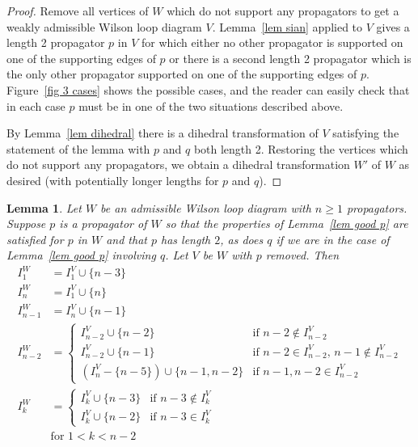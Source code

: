 \documentclass[11pt]{article}
\newtheorem{lem}[thm]{Lemma}
\theoremstyle{remark}
\theoremstyle{definition}
\begin{document}
\begin{proof}
  Remove all vertices of $W$ which do not support any propagators to get a weakly admissible Wilson loop diagram $V$.  Lemma~\ref{lem sian} applied to $V$ gives a length 2 propagator $p$ in $V$ for which either no other propagator is supported on one of the supporting edges of $p$ or there is a second length 2 propagator which is the only other propagator supported on one of the supporting edges of $p$.  Figure~\ref{fig 3 cases} shows the possible cases, and the reader can easily check that in each case $p$ must be in one of the two situations described above.

  By Lemma~\ref{lem dihedral} there is a dihedral transformation of $V$ satisfying the statement of the lemma with $p$ and $q$ both length 2.  Restoring the vertices which do not support any propagators, we obtain a dihedral transformation $W'$ of $W$ as desired (with potentially longer lengths for $p$ and $q$). 
\end{proof}


\begin{lem}\label{lem I}
  Let $W$ be an admissible Wilson loop diagram with $n\geq 1$ propagators.  Suppose $p$ is a propagator of $W$ so that the properties of Lemma~\ref{lem good p} are satisfied for $p$ in $W$ and that $p$ has length $2$, as does $q$ if we are in the case of Lemma~\ref{lem good p} involving $q$.  Let $V$ be $W$ with $p$ removed.  Then
  \begin{align*}
    I_1^{W} & = I_1^{V} \cup \{n-3\} \\
    I_n^{W} & = I_1^{V} \cup \{n\} \\
    I_{n-1}^{W} & = I_n^{V} \cup \{n-1\} \\
    I_{n-2}^{W} & =
    \begin{cases}
      I_{n-2}^{V}\cup \{n-2\} & \text{if $n-2\not\in I_{n-2}^{V}$} \\
      I_{n-2}^{V}\cup \{n-1\} & \text{if $n-2\in I_{n-2}^{V}$, $n-1\not\in I_{n-2}^{V}$} \\
      (I_{n}^{V} - \{n-5\})\cup \{n-1,n-2\} & \text{if $n-1, n-2\in I_{n-2}^{V}$}
    \end{cases} \\
    I_{k}^{W} & =
    \begin{cases}
      I_k^{V}\cup \{n-3\} & \text{if $n-3 \not\in I_k^{V}$}\\
      I_k^{V}\cup\{n-2\} & \text{if $n-3\in I_k^{V}$}
    \end{cases} \\
    & \text{for $1<k<n-2$}
  \end{align*}
\end{lem}
\end{document}
